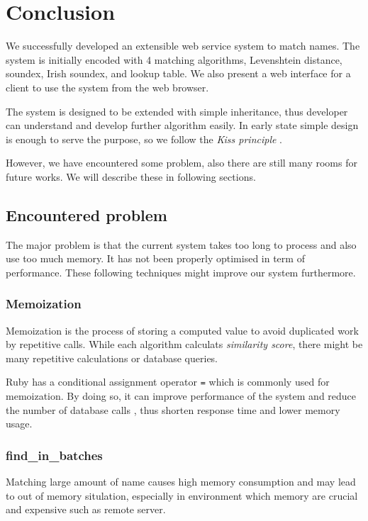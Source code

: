 \chapter{Conclusion}
\label{ch:conclusion}

We successfully developed an extensible web service system to match names.
The system is initially encoded with 4 matching algorithms,
Levenshtein distance, soundex, Irish soundex, and lookup table.
We also present a web interface for a client to use the system
from the web browser.

The system is designed to be extended with simple inheritance, thus developer
can understand and develop further algorithm easily. In early state
simple design is enough to serve the purpose, so we follow the
\emph{Kiss principle} \cite[]{kiss}.

However, we have encountered some problem, also there are still many rooms
for future works. We will describe these in following sections.

\section{Encountered problem}

The major problem is that the current system takes too long to process
and also use too much memory. It has not been properly optimised
in term of performance. These following techniques might improve
our system furthermore.

\subsection{Memoization}

Memoization is the process of storing a computed value to avoid
duplicated work by repetitive calls. While each algorithm calculats
\emph{similarity score}, there might be many repetitive calculations
or database queries.

Ruby has a conditional assignment operator \texttt{\textbar \textbar =} \cite[]{cao}
which is commonly used for memoization. By doing so, it can improve
performance of the system and reduce the number of database calls \cite[]{memoization},
thus shorten response time and lower memory usage.

\subsection{find\_in\_batches}
Matching large amount of name causes high memory consumption and may lead to
out of memory situlation, especially in environment which memory are crucial
and expensive such as remote server.

